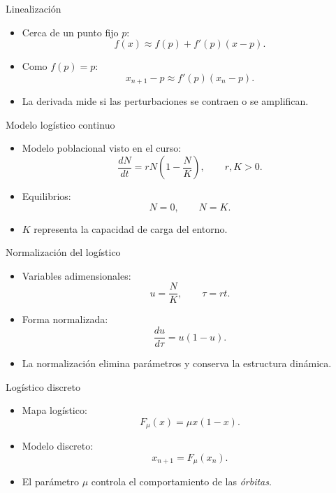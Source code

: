 \documentclass[aspectratio=169,11pt]{beamer}
\newcommand{\Fmu}{F_\mu}
\begin{document}
\begin{frame}{Linealizaci\'on}
    \begin{itemize}
        \item Cerca de un punto fijo $p$:
        \[
        f(x)\approx f(p)+f'(p)(x-p).
        \]
        \item Como $f(p)=p$:
        \[
        x_{n+1}-p\approx f'(p)(x_n-p).
        \]
        \item La derivada mide si las perturbaciones se contraen o se amplifican.
    \end{itemize}
\end{frame}

\begin{frame}{Modelo log\'istico continuo}
    \begin{itemize}
        \item Modelo poblacional visto en el curso:
        \[
        \frac{dN}{dt}=rN\left(1-\frac{N}{K}\right),\qquad r,K>0.
        \]
        \item Equilibrios:
        \[
        N=0,\qquad N=K.
        \]
        \item $K$ representa la capacidad de carga del entorno.
    \end{itemize}
\end{frame}

\begin{frame}{Normalizaci\'on del log\'istico}
    \begin{itemize}
        \item Variables adimensionales:
        \[
        u=\frac{N}{K},\qquad \tau=rt.
        \]
        \item Forma normalizada:
        \[
        \frac{du}{d\tau}=u(1-u).
        \]
        \item La normalizaci\'on elimina par\'ametros y conserva la estructura din\'amica.
    \end{itemize}
\end{frame}

\begin{frame}{Log\'istico discreto}
    \begin{itemize}
        \item Mapa log\'istico:
        \[
        \Fmu(x)=\mu x(1-x).
        \]
        \item Modelo discreto:
        \[
        x_{n+1}=\Fmu(x_n).
        \]
        \item El par\'ametro $\mu$ controla el comportamiento de las \textit{\'orbitas}.
    \end{itemize}
\end{frame}
\end{document}
